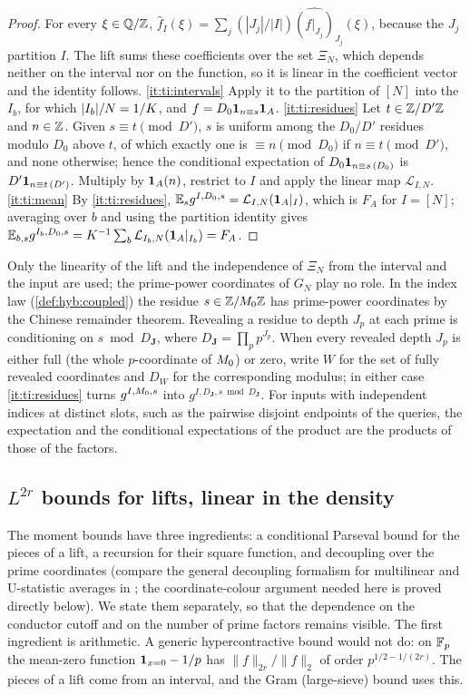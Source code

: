 \begin{proof}
For every $\xi\in\mathbb Q/\mathbb Z$, $\widehat f_I(\xi)=\sum_j(|J_j|/|I|)
\widehat{(f|_{J_j})}_{J_j}(\xi)$, because the $J_j$ partition $I$. The lift sums
these coefficients over the set $\Xi_N$, which depends neither on the interval
nor on the function, so it is linear in the coefficient vector and the identity
follows. \ref{it:ti:intervals} Apply it to the partition of $[N]$ into the
$I_b$, for which $|I_b|/N=1/K$, and $f=D_0\mathbf 1_{n\equiv s}\mathbf 1_A$.
\ref{it:ti:residues} Let $t\in\mathbb Z/D'\mathbb Z$ and $n\in\mathbb Z$. Given $s\equiv t\pmod{D'}$,
$s$ is uniform among the $D_0/D'$ residues modulo $D_0$ above $t$, of which
exactly one is $\equiv n\pmod{D_0}$ if $n\equiv t\pmod{D'}$, and none otherwise;
hence the conditional expectation of $D_0\mathbf 1_{n\equiv s\,(D_0)}$ is
$D'\mathbf 1_{n\equiv t\,(D')}$. Multiply by $\mathbf 1_A(n)$, restrict to $I$ and apply
the linear map $\mathcal L_{I,N}$. \ref{it:ti:mean} By \ref{it:ti:residues},
$\mathbb E_sg^{I,D_0,s}=\mathcal L_{I,N}(\mathbf 1_A|_I)$, which is $F_A$ for $I=[N]$; averaging
over $b$ and using the partition identity gives
$\mathbb E_{b,s}g^{I_b,D_0,s}=K^{-1}\sum_b\mathcal L_{I_b,N}(\mathbf 1_A|_{I_b})=F_A$.
\end{proof}

Only the linearity of the lift and the independence of $\Xi_N$ from the
interval and the input are used; the prime-power coordinates of $G_N$ play no
role. In the index law (\cref{def:hyb:coupled}) the residue $s\in\mathbb Z/M_0\mathbb Z$
has prime-power coordinates by the Chinese remainder theorem. Revealing a
residue to depth $J_p$ at each prime is conditioning on
$s\bmod D_{\boldsymbol J}$, where $D_{\boldsymbol J}=\prod_p p^{J_p}$.
When every revealed depth $J_p$ is either full (the whole
$p$-coordinate of $M_0$) or zero, write $W$ for the set of fully
revealed coordinates and $D_W$ for the corresponding modulus; in either case
\ref{it:ti:residues} turns $g^{I,M_0,s}$ into $g^{I,D_{\boldsymbol J},s\bmod D_{\boldsymbol J}}$. For
inputs with independent indices at distinct slots, such as the pairwise
disjoint endpoints of the queries, the expectation and the conditional
expectations of the product are the products of those of the factors.

\subsection{\texorpdfstring{$L^{2r}$}{L\textasciicircum (2r)} bounds for lifts, linear in the density}\label{subsec:lifts:moments}

The moment bounds have three ingredients: a conditional Parseval bound for the
pieces of a lift, a recursion for their square function, and decoupling over
the prime coordinates (compare the general decoupling formalism for
multilinear and U-statistic averages in \cite{dlPMS}; the coordinate-colour
argument needed here is proved directly below). We state them separately, so
that the dependence on the conductor cutoff and on the number of prime factors
remains visible. The first ingredient is arithmetic. A generic hypercontractive
bound would not do: on $\mathbb F_p$ the mean-zero function $\mathbf 1_{x=0}-1/p$ has
$\|f\|_{2r}/\|f\|_2$ of order $p^{1/2-1/(2r)}$. The pieces of a lift come from an
interval, and the Gram (large-sieve) bound uses this.

